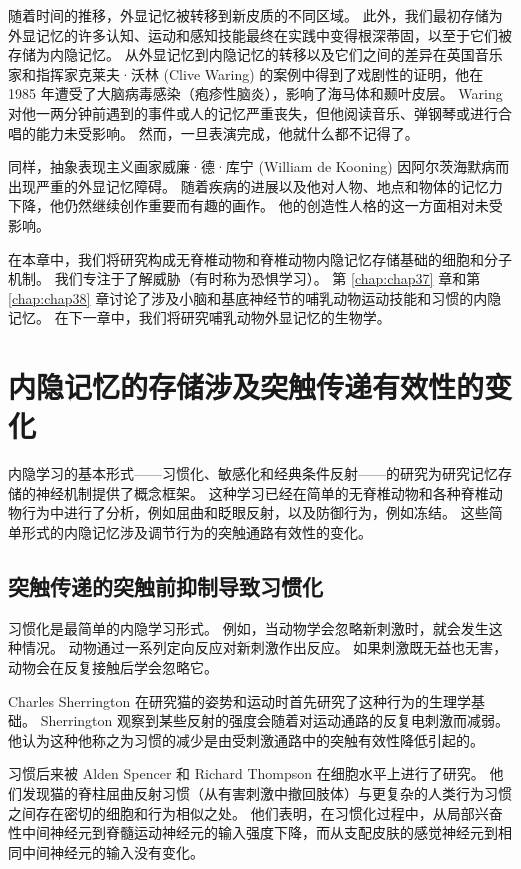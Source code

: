 随着时间的推移，外显记忆被转移到新皮质的不同区域。
此外，我们最初存储为外显记忆的许多认知、运动和感知技能最终在实践中变得根深蒂固，以至于它们被存储为内隐记忆。
从外显记忆到内隐记忆的转移以及它们之间的差异在英国音乐家和指挥家克莱夫·沃林 (Clive Waring) 的案例中得到了戏剧性的证明，他在 1985 年遭受了大脑病毒感染（疱疹性脑炎），影响了海马体和颞叶皮层。
Waring 对他一两分钟前遇到的事件或人的记忆严重丧失，但他阅读音乐、弹钢琴或进行合唱的能力未受影响。
然而，一旦表演完成，他就什么都不记得了。


同样，抽象表现主义画家威廉·德·库宁 (William de Kooning) 因阿尔茨海默病而出现严重的外显记忆障碍。
随着疾病的进展以及他对人物、地点和物体的记忆力下降，他仍然继续创作重要而有趣的画作。
他的创造性人格的这一方面相对未受影响。


在本章中，我们将研究构成无脊椎动物和脊椎动物内隐记忆存储基础的细胞和分子机制。
我们专注于了解威胁（有时称为恐惧学习）。
第 \ref{chap:chap37} 章和第 \ref{chap:chap38} 章讨论了涉及小脑和基底神经节的哺乳动物运动技能和习惯的内隐记忆。
在下一章中，我们将研究哺乳动物外显记忆的生物学。



\section{内隐记忆的存储涉及突触传递有效性的变化}

内隐学习的基本形式——习惯化、敏感化和经典条件反射——的研究为研究记忆存储的神经机制提供了概念框架。
这种学习已经在简单的无脊椎动物和各种脊椎动物行为中进行了分析，例如屈曲和眨眼反射，以及防御行为，例如冻结。
这些简单形式的内隐记忆涉及调节行为的突触通路有效性的变化。



\subsection{突触传递的突触前抑制导致习惯化}

习惯化是最简单的内隐学习形式。
例如，当动物学会忽略新刺激时，就会发生这种情况。
动物通过一系列定向反应对新刺激作出反应。
如果刺激既无益也无害，动物会在反复接触后学会忽略它。


Charles Sherrington 在研究猫的姿势和运动时首先研究了这种行为的生理学基础。
Sherrington 观察到某些反射的强度会随着对运动通路的反复电刺激而减弱。
他认为这种他称之为习惯的减少是由受刺激通路中的突触有效性降低引起的。


习惯后来被 Alden Spencer 和 Richard Thompson 在细胞水平上进行了研究。
他们发现猫的脊柱屈曲反射习惯（从有害刺激中撤回肢体）与更复杂的人类行为习惯之间存在密切的细胞和行为相似之处。
他们表明，在习惯化过程中，从局部兴奋性中间神经元到脊髓运动神经元的输入强度下降，而从支配皮肤的感觉神经元到相同中间神经元的输入没有变化。



